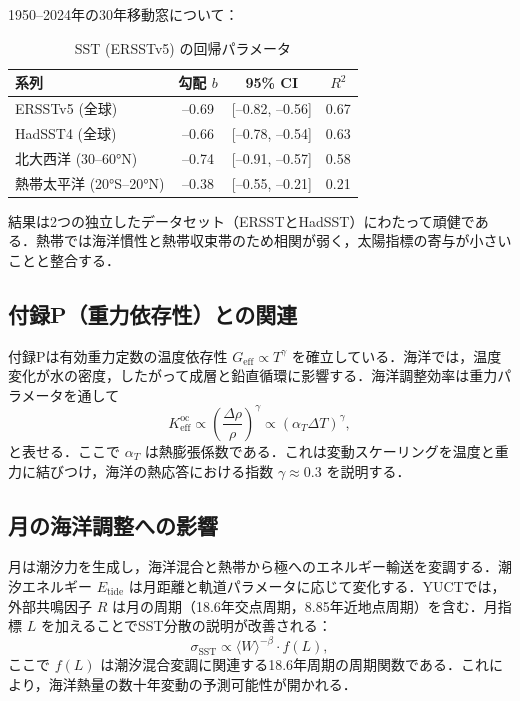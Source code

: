 \documentclass[11pt,a4paper]{article}
\newcommand{\Keff}{K_{\mathrm{eff}}}
\newcommand{\be}{\beta}
\newcommand{\ga}{\gamma}
\begin{document}
	1950–2024年の30年移動窓について：
	
	\begin{table}[htbp]
		\centering
		\caption{SST (ERSSTv5) の回帰パラメータ}
		\label{tab:sst_reg}
		\begin{tabular}{@{}lccc@{}}
			\toprule
			系列 & 勾配 $b$ & 95\% CI & $R^2$ \\
			\midrule
			ERSSTv5 (全球) & –0.69 & [–0.82, –0.56] & 0.67 \\
			HadSST4 (全球)  & –0.66 & [–0.78, –0.54] & 0.63 \\
			北大西洋 (30–60°N) & –0.74 & [–0.91, –0.57] & 0.58 \\
			熱帯太平洋 (20°S–20°N) & –0.38 & [–0.55, –0.21] & 0.21 \\
			\bottomrule
		\end{tabular}
	\end{table}
	
	結果は2つの独立したデータセット（ERSSTとHadSST）にわたって頑健である．熱帯では海洋慣性と熱帯収束帯のため相関が弱く，太陽指標の寄与が小さいことと整合する．
	
	\subsection{付録P（重力依存性）との関連}
	
	付録Pは有効重力定数の温度依存性 $G_{\text{eff}} \propto T^{\ga}$ を確立している．海洋では，温度変化が水の密度，したがって成層と鉛直循環に影響する．海洋調整効率は重力パラメータを通して
	\[
	\Keff^{\text{oc}} \propto \left( \frac{\Delta \rho}{\rho} \right)^{\ga} \propto (\alpha_T \Delta T)^{\ga},
	\]
	と表せる．ここで $\alpha_T$ は熱膨張係数である．これは変動スケーリングを温度と重力に結びつけ，海洋の熱応答における指数 $\ga \approx 0.3$ を説明する．
	
	\subsection{月の海洋調整への影響}
	
	月は潮汐力を生成し，海洋混合と熱帯から極へのエネルギー輸送を変調する．潮汐エネルギー $E_{\text{tide}}$ は月距離と軌道パラメータに応じて変化する．YUCTでは，外部共鳴因子 $R$ は月の周期（18.6年交点周期，8.85年近地点周期）を含む．月指標 $L$ を加えることでSST分散の説明が改善される：
	\[
	\sigma_{\text{SST}} \propto \langle W \rangle^{-\be} \cdot f(L),
	\]
	ここで $f(L)$ は潮汐混合変調に関連する18.6年周期の周期関数である．これにより，海洋熱量の数十年変動の予測可能性が開かれる．
	
\end{document}
